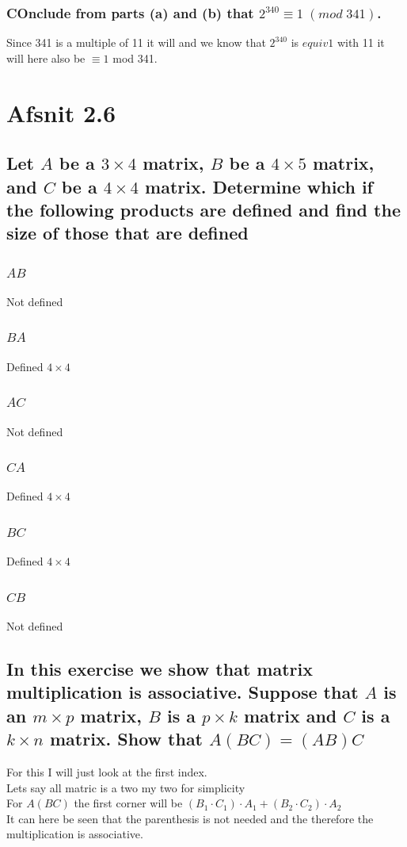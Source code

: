 \documentclass[12pt, a4paper]{report}
\begin{document}
			\subsubsection{COnclude from parts (a) and (b) that $2^{340}\equiv 1\;(mod\;341)$.}
				Since 341 is a multiple of 11 it will and we know that $2^{340}$ is $equiv 1$ with 11 it will here also be $\equiv 1$ mod 341.
	\section{Afsnit 2.6}
		\setcounter{subsection}{9}
		\subsection{Let $A$ be a $3\times 4$ matrix, $B$ be a $4\times 5$ matrix, and $C$ be a $4 \times 4$ matrix. Determine which if the following products are defined and find the size of those that are defined}

			\subsubsection{$AB$}
				Not defined
			\subsubsection{$BA$}
				Defined $4\times 4$
			\subsubsection{$AC$}
				Not defined
			\subsubsection{$CA$}
				Defined $4\times 4$
			\subsubsection{$BC$}
				Defined $4\times 4$
			\subsubsection{$CB$}
				Not defined
		\setcounter{subsection}{13}
		\subsection{In this exercise we show that matrix multiplication is associative. Suppose that $A$ is an $m\times p$ matrix, $B$ is a $p\times k$ matrix and $C$ is a $k\times n$ matrix. Show that $A(BC)=(AB)C$}
			For this I will just look at the first index.\\
			Lets say all matric is a two my two for simplicity\\
			For $A(BC)$ the first corner will be $(B_1\cdot C_1)\cdot A_1 + (B_2\cdot C_2)\cdot A_2$\\
			It can here be seen that the parenthesis is not needed and the therefore the multiplication is associative.
\end{document}
